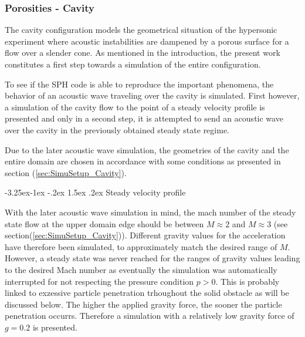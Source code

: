 \documentclass[11pt,a4paper,twoside]{report}
\makeatletter
\renewcommand\paragraph{\@startsection{paragraph}{4}{\z@}%
  {-3.25ex\@plus -1ex \@minus -.2ex}%
  {1.5ex \@plus .2ex}%
  {\normalfont\normalsize\bfseries}}
\makeatother
\begin{document}
\subsubsection{Porosities - Cavity}
The cavity configuration models the geometrical situation of the hypersonic experiment where acoustic instabilities are dampened by a porous surface for a flow over a slender cone. As mentioned in the introduction, the present work constitutes a first step towards a simulation of the entire configuration.


 


To see if the SPH code is able to reproduce the important phenomena, the behavior of an acoustic wave traveling over the cavity is simulated. First however, a simulation of the cavity flow to the point of a steady velocity profile is presented and only in a second step, it is attempted to send an acoustic wave over the cavity in the previously obtained steady state regime.



Due to the later acoustic wave simulation, the geometries of the cavity and the entire domain are chosen in accordance with some conditions as presented in section (\ref{sec:SimuSetup_Cavity}). 

\paragraph{Steady velocity profile}

With the later acoustic wave simulation in mind, the mach number of the steady state flow at the upper domain edge should be between $M\approx2$ and $M\approx3$ (see section(\ref{sec:SimuSetup_Cavity})). Different gravity values for the acceleration have therefore been simulated, to approximately match the desired range of $M$. However, a steady state was never reached for the ranges of gravity values leading to the desired Mach number as eventually the simulation was automatically interrupted for not respecting the pressure condition $p>0$. This is probably linked to exzessive particle penetration trhoughout the solid obstacle as will be discussed below. 
The higher the applied gravity force, the sooner the particle penetration occurrs. Therefore a simulation with a relatively low gravity force of $g=0.2$ is presented.
\end{document}
